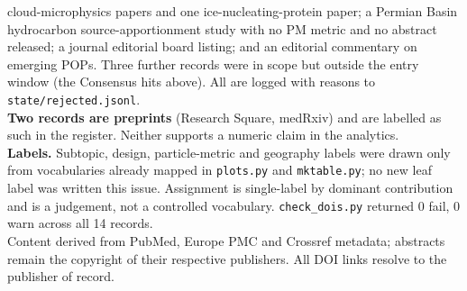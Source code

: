 \documentclass[10pt]{article}
\begin{document}
\begin{keybox}
{cloud-microphysics papers and one ice-nucleating-protein paper; a Permian Basin
hydrocarbon source-apportionment study with no PM metric and no abstract released; a
journal editorial board listing; and an editorial commentary on emerging POPs. Three
further records were in scope but outside the entry window (the Consensus hits above).
All are logged with reasons to \texttt{state/rejected.jsonl}.\\[0.8mm]
\textbf{Two records are preprints} (Research Square, medRxiv) and are labelled as such in
the register. Neither supports a numeric claim in the analytics.\\[0.8mm]
\textbf{Labels.} Subtopic, design, particle-metric and geography labels were drawn only
from vocabularies already mapped in \texttt{plots.py} and \texttt{mktable.py}; no new leaf
label was written this issue. Assignment is single-label by dominant contribution and is a
judgement, not a controlled vocabulary. \texttt{check\_dois.py} returned 0 fail, 0 warn
across all 14 records.\\[0.8mm]
Content derived from PubMed, Europe PMC and Crossref metadata; abstracts remain the
copyright of their respective publishers. All DOI links resolve to the publisher of
record.\par}
\end{keybox}
\end{document}
